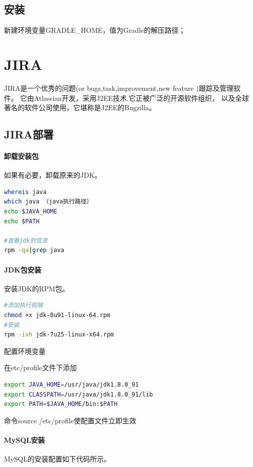 \documentclass{book}
\begin{document}
\subsection{安装}

新建环境变量GRADLE\_HOME，值为Gradle的解压路径；

\section{JIRA}

JIRA是一个优秀的问题(or bugs,task,improvement,new feature )跟踪及管理软件。
它由Atlassian开发，采用J2EE技术.它正被广泛的开源软件组织，
以及全球著名的软件公司使用，它堪称是J2EE的Bugzilla。

\subsection{JIRA部署}

\paragraph{卸载安装包}如果有必要，卸载原来的JDK。

\begin{lstlisting}[language=Bash]
whereis java
which java （java执行路径）
echo $JAVA_HOME
echo $PATH

#查看jdk的信息
rpm -qa|grep java
\end{lstlisting}

\paragraph{JDK包安装}安装JDK的RPM包。

\begin{lstlisting}[language=Bash]
#添加执行权限
chmod +x jdk-8u91-linux-64.rpm
#安装
rpm -ivh jdk-7u25-linux-x64.rpm
\end{lstlisting}

配置环境变量

在etc/profile文件下添加

\begin{lstlisting}[language=Bash]
export JAVA_HOME=/usr/java/jdk1.8.0_91
export CLASSPATH=/usr/java/jdk1.8.0_91/lib
export PATH=$JAVA_HOME/bin:$PATH
\end{lstlisting}

命令source /etc/profile使配置文件立即生效

\paragraph{MySQL安装}MySQL的安装配置如下代码所示。
\end{document}
